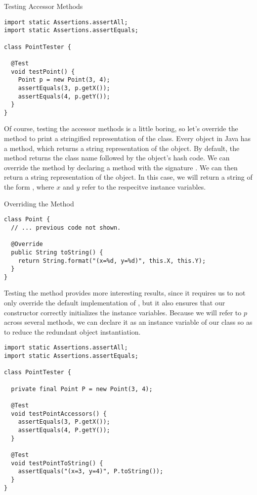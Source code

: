 \begin{cl}{Testing Accessor Methods}
\begin{lstlisting}[language=MyJava]
import static Assertions.assertAll;
import static Assertions.assertEquals;

class PointTester {
  
  @Test
  void testPoint() {
    Point p = new Point(3, 4);
    assertEquals(3, p.getX());
    assertEquals(4, p.getY());
  }
}
\end{lstlisting}
\end{cl}

Of course, testing the accessor methods is a little boring, so let's override the  method to print a stringified representation of the  class. Every object in Java has a  method, which returns a string representation of the object. By default, the  method returns the class name followed by the object's hash code. We can override the  method by declaring a  method with the signature . We can then return a string representation of the object. In this case, we will return a string of the form , where $x$ and $y$ refer to the respecitve instance variables.

\begin{cl}[]{Overriding the  Method}
\begin{lstlisting}[language=MyJava]
class Point {
  // ... previous code not shown.

  @Override
  public String toString() {
    return String.format("(x=%d, y=%d)", this.X, this.Y);
  }
}
\end{lstlisting}
\end{cl}

Testing the  method provides more interesting results, since it requires us to not only override the default implementation of , but it also ensures that our constructor correctly initializes the instance variables. Because we will refer to $p$ across several methods, we can declare it as an instance variable of our  class so as to reduce the redundant object instantiation.

\begin{cl}[]{}
\begin{lstlisting}[language=MyJava]
import static Assertions.assertAll;
import static Assertions.assertEquals;

class PointTester {

  private final Point P = new Point(3, 4);

  @Test
  void testPointAccessors() {
    assertEquals(3, P.getX());
    assertEquals(4, P.getY());
  }

  @Test
  void testPointToString() {
    assertEquals("(x=3, y=4)", P.toString());
  }
}
\end{lstlisting}
\end{cl}


